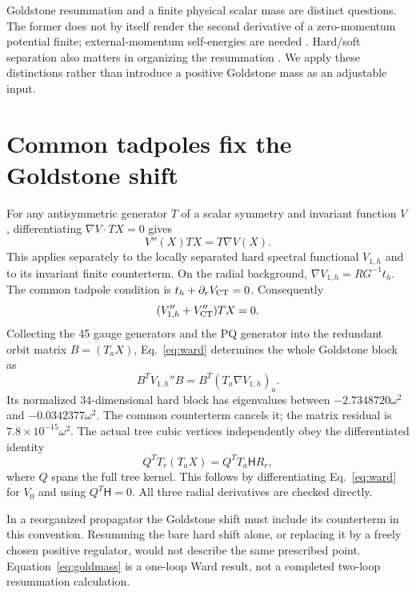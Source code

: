 \documentclass[11pt]{article}
\begin{document}
Goldstone resummation and a finite physical scalar mass are distinct
questions. The former does not by itself render the second derivative
of a zero-momentum potential finite; external-momentum self-energies
are needed \cite{bg}. Hard/soft separation also matters in organizing
the resummation \cite{ek}. We apply these distinctions rather than
introduce a positive Goldstone mass as an adjustable input.

\section{Common tadpoles fix the Goldstone shift}
For any antisymmetric generator $T$ of a scalar symmetry and invariant
function $V$, differentiating $\nabla V\cdot TX=0$ gives
\begin{equation}
 V''(X)TX=T\nabla V(X).
 \label{eq:ward}
\end{equation}
This applies separately to the locally separated hard spectral
functional $V_{1,h}$ and to its invariant finite counterterm. On the
radial background, $\nabla V_{1,h}=RG^{-1}t_h$. The common tadpole
condition is $t_h+\partial_r V_{\rm CT}=0$. Consequently
\begin{equation}
 (V_{1,h}''+V_{\rm CT}'')TX=0.
 \label{eq:goldmass}
\end{equation}
Collecting the 45 gauge generators and the PQ generator into the
redundant orbit matrix $B=(T_aX)$, Eq.~\eqref{eq:ward} determines the
whole Goldstone block as
\begin{equation}
 B^T V_{1,h}'' B=B^T(T_a\nabla V_{1,h})_a.
\end{equation}
Its normalized 34-dimensional hard block has eigenvalues between
$-2.7348720\omega^2$ and $-0.0342377\omega^2$. The common counterterm
cancels it; the matrix residual is $7.8\times10^{-15}\omega^2$.
The actual tree cubic vertices independently obey the differentiated
identity
\begin{equation}
 Q^T T_r(T_aX)=Q^TT_a\mathsf H R_r,
 \label{eq:cubicward}
\end{equation}
where $Q$ spans the full tree kernel. This follows by differentiating
Eq.~\eqref{eq:ward} for $V_0$ and using $Q^T\mathsf H=0$.
All three radial derivatives are checked directly.

In a reorganized propagator the Goldstone shift must include its
counterterm in this convention. Resumming the bare hard shift alone,
or replacing it by a freely chosen positive regulator, would not
describe the same prescribed point. Equation~\eqref{eq:goldmass} is
a one-loop Ward result, not a completed two-loop resummation calculation.
\end{document}
